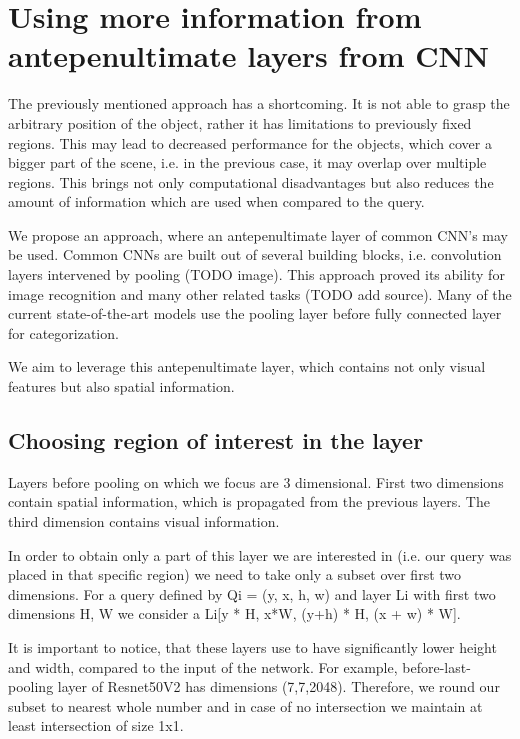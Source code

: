 \section{Using more information from antepenultimate layers from CNN}

The previously mentioned approach has a shortcoming. It is not able to grasp the arbitrary position of the object, rather it has limitations to previously fixed regions. This may lead to decreased performance for the objects, which cover a bigger part of the scene, i.e. in the previous case, it may overlap over multiple regions. This brings not only computational disadvantages but also reduces the amount of information which are used when compared to the query.

We propose an approach, where an antepenultimate layer of common CNN's may be used. Common CNNs are built out of several building blocks, i.e. convolution layers intervened by pooling (TODO image). This approach proved its ability for image recognition and many other related tasks (TODO add source). Many of the current state-of-the-art models use the pooling layer before fully connected layer for categorization.

We aim to leverage this antepenultimate layer, which contains not only visual features but also spatial information.

\subsection{Choosing region of interest in the layer}

Layers before pooling on which we focus are 3 dimensional. First two dimensions contain spatial information, which is propagated from the previous layers. The third dimension contains visual information.

In order to obtain only a part of this layer we are interested in (i.e. our query was placed in that specific region) we need to take only a subset over first two dimensions. For a query defined by Qi = (y, x, h, w) and layer Li with first two dimensions H, W we consider a Li[y * H, x*W, (y+h) * H, (x + w) * W]. 

It is important to notice, that these layers use to have significantly lower height and width, compared to the input of the network. For example, before-last-pooling layer of Resnet50V2 has dimensions (7,7,2048). Therefore, we round our subset to nearest whole number and in case of no intersection we maintain at least intersection of size 1x1.

